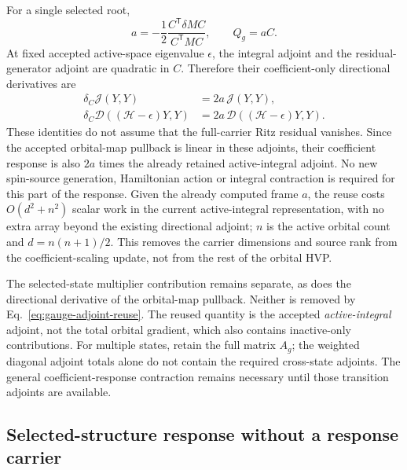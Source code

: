 \documentclass[11pt,a4paper]{article}
\newcommand{\Tr}{^{\mathsf T}}
\begin{document}
For a single selected root,
\begin{equation}
 a=-\frac12\frac{C\Tr\delta M C}{C\Tr MC},\qquad Q_g=aC.
\end{equation}
At fixed accepted active-space eigenvalue $\epsilon$, the integral adjoint and the
residual-generator adjoint are quadratic in $C$. Therefore their
coefficient-only directional derivatives are
\begin{align}
 \delta_C\mathcal J(Y,Y)&=2a\,\mathcal J(Y,Y),\\
 \delta_C\mathcal D((\mathcal H-\epsilon)Y,Y)
 &=2a\,\mathcal D((\mathcal H-\epsilon)Y,Y).
 \label{eq:gauge-adjoint-reuse}
\end{align}
These identities do not assume that the full-carrier Ritz residual vanishes.
Since the accepted orbital-map pullback is linear in these adjoints, their
coefficient response is also $2a$ times the already retained active-integral
adjoint. No new spin-source generation, Hamiltonian action or integral
contraction is required for this part of the response.
Given the already computed frame $a$, the reuse costs $O(d^2+n^2)$ scalar
work in the current active-integral representation, with no extra array
beyond the existing directional adjoint; $n$ is the active orbital count
and $d=n(n+1)/2$. This removes the carrier dimensions and source rank from
the coefficient-scaling update, not from the rest of the orbital HVP.

The selected-state multiplier contribution remains separate, as does the
directional derivative of the orbital-map pullback. Neither is removed by
Eq.~\eqref{eq:gauge-adjoint-reuse}. The reused quantity is the accepted
\emph{active-integral} adjoint, not the total orbital gradient, which also
contains inactive-only contributions. For multiple states, retain the full
matrix $A_g$; the weighted diagonal adjoint totals alone do not contain
the required cross-state adjoints. The general coefficient-response
contraction remains necessary until those transition adjoints are available.

\subsection{Selected-structure response without a response carrier}\label{sec:factor-response}
\end{document}
